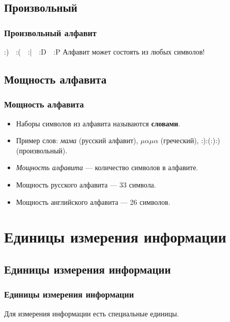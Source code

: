 \documentclass[compress,red]{beamer}
\begin{document}
\subsection{Произвольный}
\begin{frame}[fragile]
  \frametitle{Произвольный алфавит}
  \begin{center}
    \Huge{:)\ \ :(\ \ :|\ \ :D\ \ :P}\newline\newline
    \Large{Алфавит может состоять из любых символов!}
  \end{center}
\end{frame}

\subsection{Мощность алфавита}
\begin{frame}[fragile]
  \frametitle{Мощность алфавита}
  \begin{itemize}
    \item Наборы символов из алфавита называются \textbf{словами}.
    \item Пример слов: \emph{мама} (русский алфавит), $\mu \alpha \mu \alpha$ (греческий), :):(:):) (произвольный).
    \item \emph{Мощность алфавита} --- количество символов в алфавите.
    \item Мощность русского алфавита --- 33 символа.
    \item Мощность английского алфавита --- 26 символов.
  \end{itemize}
\end{frame}

\section{Единицы измерения информации}
\subsection{Единицы измерения информации}
\begin{frame}[fragile]
  \frametitle{Единицы измерения информации}
  \begin{center}
    \Huge{Для измерения информации есть специальные единицы}.\newline
  \end{center}
\end{frame}
\end{document}
